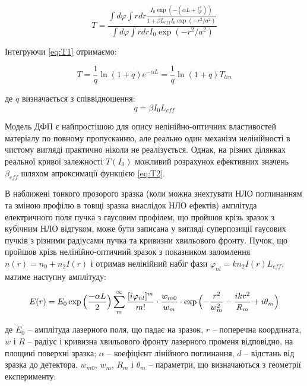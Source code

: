 \begin{equation}\label{eq:T1}
T = \frac{\int d \varphi \int r dr \frac{I_0 \exp{(-(\alpha L +\frac{r^2}{a^2}))}}{1+\beta L_{eff} I_0 \exp{(-r^2/a^2)}}}
{\int d\varphi\int r dr I_0 \exp{(-r^2/a^2)}}
\end{equation}

Інтегруючи  \ref{eq:T1} отримаємо:

\begin{equation}\label{eq:T2}
T = \frac{1}{q} \ln{(1+q)} e^{-\alpha L} =\frac{1}{q}\ln{(1+q)}  T_{lin}
\end{equation}

де $q$ визначається з співвідношення:
\begin{equation}\label{eq:q}
q = \beta I_0 L_{eff}
\end{equation}

Модель ДФП є найпростішою для опису нелінійно-оптичних властивостей матеріалу по повному пропусканню, але реально один механізм нелінійності в чистому вигляді практично ніколи не реалізується.
Однак, на різних ділянках реальної кривої залежності $T(I_0)$ можливий розрахунок
ефективних значень $\beta_{eff}$ шляхом апроксимації функцією \ref{eq:T2}.


В наближені тонкого прозорого зразка (коли можна знехтувати НЛО
поглинанням та зміною профілю в товщі зразка внаслідок НЛО
ефектів) амплітуда електричного поля пучка з гаусовим профілем, що пройшов крізь зразок з кубічним НЛО відгуком, може бути записана у вигляді суперпозиції гаусових пучків з різними радіусами пучка та кривизни хвильового фронту. Пучок, що пройшов крізь нелінійно-оптичний зразок з показником заломлення $n(r) = n_0 + n_2 I(r)$ і отримав нелінійний набіг фази $\varphi_{nl} = k n_2 I(r) L_{eff}$, матиме наступну амплітуду:

\begin{equation}\label{eq:E}
E(r) = E_0 \exp{\Bigl(\frac{-\alpha L}{2}\Bigl)} \sum_{m}^{\infty} \frac{[i\varphi_{nl}]^m}{m!} \cdot \frac{w_{m0}}{w_m} \cdot \exp{ \Bigl( - \frac{r^2}{w_{m}^{2}} - \frac{i k r^2}{R_m} + i \theta_m \Bigl)}
\end{equation}

де $E_0$ – амплітуда лазерного поля, що падає на зразок, $r$ – поперечна координата, $w$ і $R$ -- радіус і
кривизна хвильового фронту лазерного променя відповідно, на площині поверхні
зразка; $\alpha$ -- коефіцієнт лінійного поглинання, $d$ -- відстань від зразка до детектора, $w_{m0}$, $w_m$, $R_m$ і $\theta_m$ -- параметри, що
визначаються з геометрії експерименту:


